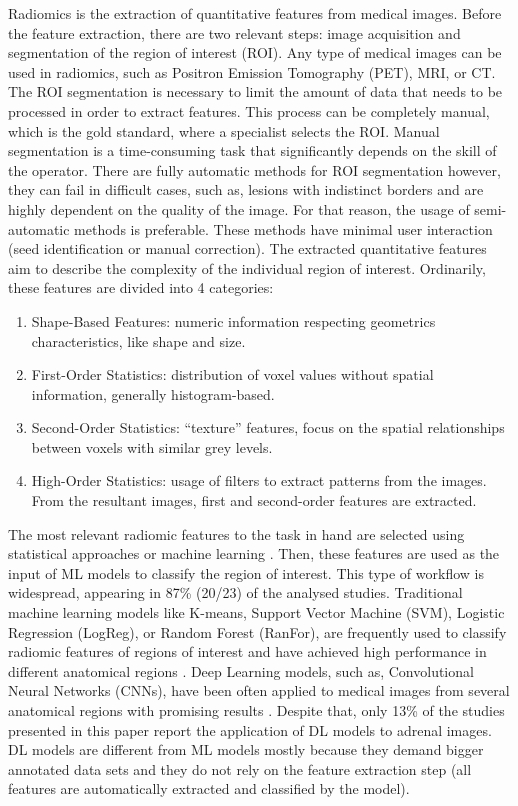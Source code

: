 \documentclass{article}
\begin{document}
Radiomics is the extraction of quantitative features from medical images. Before the feature extraction, there are two relevant
steps: image acquisition and segmentation of the region of interest (ROI). Any type of medical images can be used in radiomics,
such as Positron Emission Tomography (PET), MRI, or CT. The ROI segmentation is necessary to limit the amount of data that needs
to be processed in order to extract features. This process can be completely manual, which is the gold standard, where a specialist
selects the ROI. Manual segmentation is a time-consuming task that significantly depends on the skill of the operator. There are
fully automatic methods for ROI segmentation however, they can fail in difficult cases, such as, lesions with indistinct borders
and are highly dependent on the quality of the image. For that reason, the usage of semi-automatic methods is preferable.
These methods have minimal user interaction (seed identification or manual correction). The extracted quantitative features aim
to describe the complexity of the individual region of interest. Ordinarily, these features are divided into 4 categories:
\begin{enumerate}
    \item Shape-Based Features: numeric information respecting geometrics characteristics, like shape and size.
    \item First-Order Statistics: distribution of voxel values without spatial information, generally histogram-based.
    \item Second-Order Statistics: “texture” features, focus on the spatial relationships between voxels with similar grey levels.
    \item High-Order Statistics: usage of filters to extract patterns from the images. From the resultant images, first and second-order features are extracted.
\end{enumerate}

The most relevant radiomic features to the task in hand are selected using
statistical approaches or machine learning \cite{Zhang2022}. Then, these
features are used as the input of ML models to classify the region of interest.
This type of workflow is widespread, appearing in 87\% (20/23) of the analysed
studies. Traditional machine learning models like K-means, Support Vector
Machine (SVM), Logistic Regression (LogReg), or Random Forest (RanFor), are
frequently used to classify radiomic features of regions of interest and have
achieved high performance in different anatomical regions \cite{Zhang2022,
    Wagner2021}. Deep Learning models, such as, Convolutional Neural Networks
(CNNs), have been often applied to medical images from several anatomical
regions with promising results \cite{Anaya-Isaza2021}. Despite that, only 13\%
of the studies presented in this paper report the application of DL models to
adrenal images. DL models are different from ML models mostly because they
demand bigger annotated data sets and they do not rely on the feature extraction
step (all features are automatically extracted and classified by the model).
\end{document}
